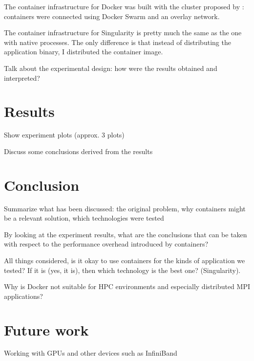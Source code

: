 \documentclass[12pt]{article}
\begin{document}
The container infrastructure for Docker was built with the cluster proposed by \cite{7868429}: containers were connected using Docker Swarm and an overlay network.

The container infrastructure for Singularity is pretty much the same as the one with native processes. The only difference is that instead of distributing the application binary, I distributed the container image.

Talk about the experimental design: how were the results obtained and interpreted?

\section{Results}
Show experiment plots (approx. 3 plots)

Discuss some conclusions derived from the results

\section{Conclusion}
Summarize what has been discussed: the original problem, why containers might be a relevant solution, which technologies were tested

By looking at the experiment results, what are the conclusions that can be taken with respect to the performance overhead introduced by containers?

All things considered, is it okay to use containers for the kinds of application we tested? If it is (yes, it is), then which technology is the best one? (Singularity).

Why is Docker not suitable for HPC environments and especially distributed MPI applications? 

\section{Future work}
Working with GPUs and other devices such as InfiniBand



\end{document}
